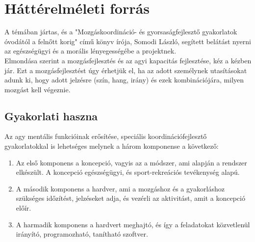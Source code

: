 \documentclass[tocnopagenum]{thesis-ekf}
\theoremstyle{definition}
\theoremstyle{remark}
\begin{document}
	\section{Háttérelméleti forrás}
	\par
	A témában jártas, és a "Mozgáskoordináció- és gyorsaságfejlesztő gyakorlatok óvodától a felnőtt korig" \cite{SLaszlo} című könyv írója, Somodi László, segített belátást nyerni az egészségügyi és a morális lényegességébe a projektnek. \\ Elmondása szerint a mozgásfejlesztés és az agyi kapacitás fejlesztése, kéz a kézben jár. Ezt a mozgásfejlesztést úgy érhetjük el, ha az adott személynek utasításokat adunk ki, hogy adott jelzésre (szín, hang, irány) és ezek kombinációjára, milyen mozgást kell végeznie.
	\par 
	\subsection{Gyakorlati haszna}
	Az agy mentális funkcióinak erősítése, speciális koordinációfejlesztő gyakorlatokkal is lehetséges melynek a három komponense a következő: 
	\begin{enumerate}
	 
			\item	Az első komponens a koncepció, vagyis az a módszer, ami alapján a rendszer elkészült. A koncepció egészségügyi, és sport-rekreációs tevékenység alapú.
			\item	A második komponens a hardver, ami a mozgáshoz és a gyakorláshoz szükséges időzítést, jelzéseket adja, és vezérli az aktivitást, amit a koncepció előír.
			\item	A harmadik komponens a hardvert meghajtó, és így a feladatokat közvetlenül irányító, programozható, tanítható szoftver.
	\end{enumerate}
\end{document}
